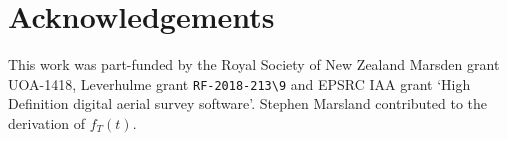 \documentclass[useAMS, usenatbib, referee]{biom}\usepackage[]{graphicx}\usepackage[]{color}
\begin{document}





\section*{Acknowledgements}
This work was part-funded by the Royal Society of New Zealand  Marsden grant UOA-1418,  Leverhulme grant \verb|RF-2018-213\9| and EPSRC IAA grant `High Definition digital aerial survey software'. Stephen Marsland contributed to the derivation of $f_T(t)$.




\end{document}
